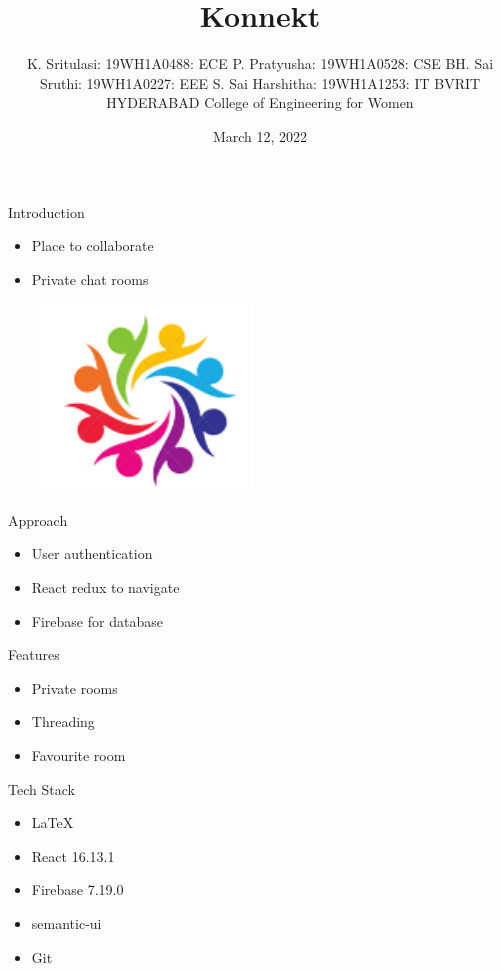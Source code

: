 \documentclass[14pt]{beamer}
\title{Konnekt}
\author[]{K. Sritulasi: 19WH1A0488: ECE \vspace*{0.1cm} \newline P. Pratyusha: 19WH1A0528: CSE  \vspace*{0.1cm} \newline BH. Sai Sruthi: 19WH1A0227: EEE \vspace*{0.1cm} \newline S. Sai Harshitha: 19WH1A1253: IT \vspace*{0.1cm} \newline \vspace*{0.2cm} \small {\newline BVRIT HYDERABAD College of Engineering for Women}}
\date{\vspace*{0.02cm} March 12, 2022}
\begin{document}
\begin{frame}
	\titlepage
\end{frame}

\begin{frame}{Introduction}
\begin{itemize}
	\item Place to collaborate
	\item Private chat rooms
		\begin{center}
			\includegraphics[height=5cm, width=6cm]{konnect_logo.png}
		\end{center}

	\end{itemize}
\end{frame}

\begin{frame}{Approach}
		\begin{itemize}
			\item User authentication
			\item React redux to navigate
			\item Firebase for database
		\end{itemize}
\end{frame}

\begin{frame}{Features}
	\begin{itemize}
		\item Private rooms
		\item Threading
		\item Favourite room
	\end{itemize}
\end{frame}

\begin{frame}{Tech Stack}
\begin{itemize}
	\item LaTeX
	\item React 16.13.1
	\item Firebase 7.19.0
	\item semantic-ui
	\item Git
\end{itemize}
\end{frame}
\end{document}
